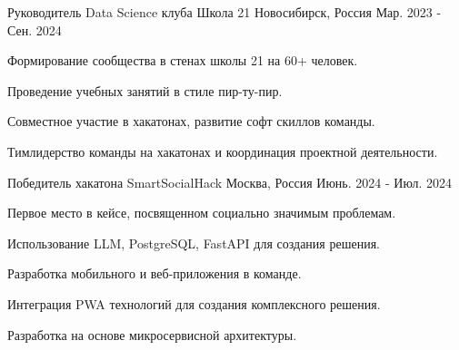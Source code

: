 \begin{cventries}

  \cventry
    {Руководитель Data Science клуба} %
    {Школа 21} %
    {Новосибирск, Россия} %
    {Мар. 2023 - Сен. 2024} %
    {
      \begin{cvitems} %
        \item {Формирование сообщества в стенах школы 21 на 60+ человек.}
        \item {Проведение учебных занятий в стиле пир-ту-пир.}
        \item {Совместное участие в хакатонах, развитие софт скиллов команды.}
        \item {Тимлидерство команды на хакатонах и координация проектной деятельности.}
      \end{cvitems}
    }

  \cventry
    {Победитель хакатона} %
    {SmartSocialHack} %
    {Москва, Россия} %
    {Июнь. 2024 - Июл. 2024} %
    {
      \begin{cvitems} %
        \item {Первое место в кейсе, посвященном социально значимым проблемам.}
        \item {Использование LLM, PostgreSQL, FastAPI для создания решения.}
        \item {Разработка мобильного и веб-приложения в команде.}
        \item {Интеграция PWA технологий для создания комплексного решения.}
        \item {Разработка на основе микросервисной архитектуры.}
      \end{cvitems}
    }

\end{cventries}
\newpage